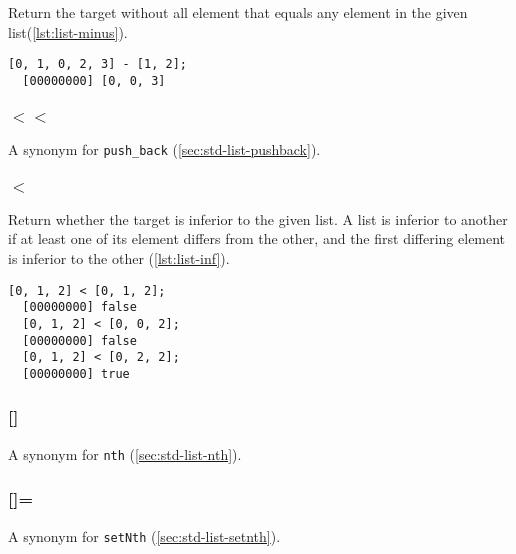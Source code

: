 Return the target without all element that equals any element in the
given list(\autoref{lst:list-minus}).

\begin{lstlisting}[caption=List.'', label=lst:list-minus,
  float=\floatpos]
  [0, 1, 0, 2, 3] - [1, 2];
  [00000000] [0, 0, 3]
\end{lstlisting}

\subsubsection{$<<$}

A synonym for \lstinline|push_back| (\autoref{sec:std-list-pushback}).

\subsubsection{$<$}

Return whether the target is inferior to the given list. A list is
inferior to another if at least one of its element differs from the
other, and the first differing element is inferior to the other
(\autoref{lst:list-inf}).

\begin{lstlisting}[caption=List.'', label=lst:list-inf,
  float=\floatpos]
  [0, 1, 2] < [0, 1, 2];
  [00000000] false
  [0, 1, 2] < [0, 0, 2];
  [00000000] false
  [0, 1, 2] < [0, 2, 2];
  [00000000] true
\end{lstlisting}

\subsubsection{[]}
A synonym for \lstinline|nth| (\autoref{sec:std-list-nth}).

\subsubsection{[]=}
A synonym for \lstinline|setNth| (\autoref{sec:std-list-setnth}).


